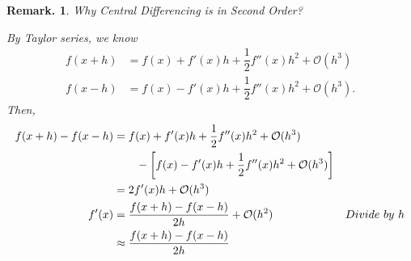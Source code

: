 \documentclass[12pt, a4paper]{article}
\newtheorem{rmk}{Remark.}[section]
\def\bigO{\mathcal{O}}
\begin{document}
\begin{rmk}
	Why Central Differencing is in Second Order? \par 
	By Taylor series, we know \begin{align*}f(x+h)&=f(x)+f'(x)h+\dfrac{1}{2}f''(x)h^2+\bigO(h^3)\\f(x-h)&=f(x)-f'(x)h+\dfrac{1}{2}f''(x)h^2+\bigO(h^3).\end{align*} Then, \begin{align*}f(x+h)-f(x-h)&=f(x)+f'(x)h+\dfrac{1}{2}f''(x)h^2+\bigO(h^3)\\&\qquad-\qty[f(x)-f'(x)h+\dfrac{1}{2}f''(x)h^2+\bigO(h^3)]\\&=2f'(x)h+\bigO(h^3)\\f'(x)&=\dfrac{f(x+h)-f(x-h)}{2h}+\bigO(h^2)&Divide\ by\ h\\&\approx\dfrac{f(x+h)-f(x-h)}{2h}\end{align*}
\end{rmk}
\end{document}
